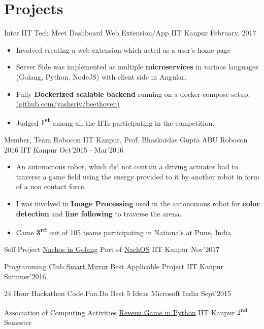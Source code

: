 \section*{\sc Projects}
\vspace{-2mm}
\hrulefill
\vspace{.2cm}

\cventry
{Inter IIT Tech Meet}
{Dashboard Web Extension/App}
{IIT Kanpur}
{February, 2017}
{
  \begin{itemize}
  \item Involved creating a web extension which acted as a user’s home page
  \item Server Side was implemented as multiple \textbf{microservices} in
    various languages (Golang, Python, NodeJS) with client side in Angular.
  \item Fully \textbf{Dockerized scalable backend} running on a docker-compose
    setup. \\
    \href{https://github.com/yashsriv/beethoven}{(github.com/yashsriv/beethoven)}
  \item Judged \textbf{1\textsuperscript{st}} among all the IITs participating
    in the competition.
  \end{itemize}
}

\cventry
{Member, Team Robocon IIT Kanpur, Prof. Bhaskardas Gupta}
{ABU Robocon 2016}
{IIT Kanpur}
{Oct'2015 - Mar'2016}
{
  \begin{itemize}
  \item An autonomous robot, which did not contain a driving actuator had to
    traverse a game field using the energy provided to it by another robot in
    form of a non contact force.
  \item I was involved in \textbf{Image Processing} used in the autonomous
    robot for \textbf{color detection} and \textbf{line following} to
    traverse the arena.
  \item Came \textbf{3\textsuperscript{rd}} out of 105 teams participating in Nationals at Pune, India.
  \end{itemize}
}

\smallcventry
{Self Project}
{\href{https://github.com/yashsriv/go-nachos}{Nachos in Golang}}
{Port of \href{https://homes.cs.washington.edu/~tom/nachos/}{NachOS}}
{IIT Kanpur}
{Nov'2017}

\smallcventry
{Programming Club}
{\href{http://pclub.in/project/2016/07/06/smartmirror.html}{Smart Mirror}}
{Best Applicable Project}
{IIT Kanpur}
{Summer'2016}

\smallcventry
{24 Hour Hackathon}
{Code.Fun.Do}
{Best 5 Ideas}
{Microsoft India}
{Sept'2015}

\smallcventry
{Association of Computing Activities}
{\href{http://github.com/yashsriv/Reversi-Python}{Reversi Game in Python}}
{}
{IIT Kanpur}
{2\textsuperscript{nd} Semester}
